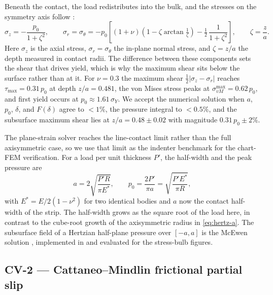Beneath the contact, the load redistributes into the bulk, and the stresses on the
symmetry axis follow \citep[Eq.~3.45]{johnson1985contact}:
\begin{equation}\label{eq:hertz-subsurface}
  \sigma_z = -\frac{p_0}{1+\zeta^2}, \qquad
  \sigma_r = \sigma_\theta
  = -p_0\!\left[(1+\nu)\!\left(1-\zeta\arctan\tfrac{1}{\zeta}\right)-\tfrac12\,\frac{1}{1+\zeta^2}\right],
  \qquad \zeta=\frac{z}{a}.
\end{equation}
Here $\sigma_z$ is the axial stress, $\sigma_r=\sigma_\theta$ the in-plane normal
stress, and $\zeta=z/a$ the depth measured in contact radii. The difference between these
components sets the shear that drives yield, which is why the maximum shear sits below the
surface rather than at it. For $\nu=0.3$ the maximum shear
$\tfrac12|\sigma_z-\sigma_r|$ reaches $\tau_{\max}=0.31\,p_0$ at depth $z/a=0.481$, the
von Mises stress peaks at $\sigma_{vM}^{\max}=0.62\,p_0$, and first yield occurs at
$p_0\approx 1.61\,\sigma_Y$. We accept the numerical solution when $a$, $p_0$, $\delta$,
and $F(\delta)$ agree to $<1\%$, the pressure integral to $<0.5\%$, and the subsurface
maximum shear lies at $z/a=0.48\pm0.02$ with magnitude $0.31\,p_0\pm2\%$.

The plane-strain solver reaches the line-contact limit rather than the full axisymmetric
case, so we use that limit as the indenter benchmark for the chart-FEM verification. For a
load per unit thickness $P'$, the half-width and the peak pressure are
\begin{equation}\label{eq:line-contact}
  a = 2\sqrt{\frac{P'R}{\pi E^\ast}}, \qquad
  p_0 = \frac{2P'}{\pi a} = \sqrt{\frac{P'E^\ast}{\pi R}},
\end{equation}
with $E^\ast = E/2(1-\nu^2)$ for two identical bodies and $a$ now the contact half-width
of the strip. The half-width grows as the square root of the load here, in contrast to the
cube-root growth of the axisymmetric radius in \eqref{eq:hertz-a}. The subsurface field of
a Hertzian half-plane pressure over $[-a,a]$ is the McEwen solution
\citep[Eq.~4.49]{johnson1985contact}, implemented in  and
evaluated for the stress-bulb figures.

\subsection{CV-2 --- Cattaneo--Mindlin frictional partial slip}\label{app:cattaneo}

